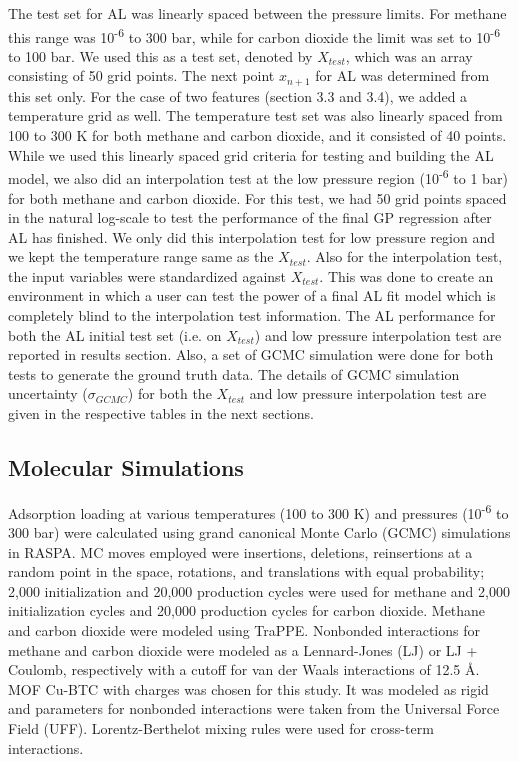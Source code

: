 \documentclass[twoside,twocolumn,9pt]{article}
\begin{document}
The test set for AL was linearly spaced between the pressure limits. For methane this range was 10\textsuperscript{-6} to 300 bar, while for carbon dioxide the limit was set to 10\textsuperscript{-6} to 100 bar. We used this as a test set, denoted by $X_{test}$, which was an array consisting of 50 grid points. The next point $x_{n+1}$ for AL was determined from this set only. For the case of two features (section 3.3 and 3.4), we added a temperature grid as well. The temperature test set was also linearly spaced from 100 to 300 K for both methane and carbon dioxide, and it consisted of 40 points. While we used this linearly spaced grid criteria for testing and building the AL model, we also did an interpolation test at the low pressure region (10\textsuperscript{-6} to 1 bar) for both methane and carbon dioxide. For this test, we had 50 grid points spaced in the natural log-scale to test the performance of the final GP regression after AL has finished. We only did this interpolation test for low pressure region and we kept the temperature range same as the $X_{test}$. Also for the interpolation test, the input variables were standardized against $X_{test}$. This was done to create an environment in which a user can test the power of a final AL fit model which is completely blind to the interpolation test information. The AL performance for both the AL initial test set (i.e. on $X_{test}$) and low pressure interpolation test are reported in results section. Also, a set of GCMC simulation were done for both tests to generate the ground truth data. The details of GCMC simulation uncertainty ($\sigma_{GCMC}$) for both the $X_{test}$ and low pressure interpolation test are given in the respective tables in the next sections.

\subsection{Molecular Simulations}
Adsorption loading at various temperatures (100 to 300 K) and pressures (10\textsuperscript{-6} to 300 bar) were calculated using grand canonical Monte Carlo (GCMC) simulations in RASPA. \cite{gcmc,gcmc2,raspa} MC moves employed were insertions, deletions, reinsertions at a random point in the space, rotations, and translations with equal probability; 2,000 initialization and 20,000 production cycles were used for methane and 2,000 initialization cycles and 20,000 production cycles for carbon dioxide. Methane and carbon dioxide were modeled using TraPPE.\cite{trappe} Nonbonded interactions for methane and carbon dioxide were modeled as a Lennard-Jones (LJ) or LJ + Coulomb, respectively with a cutoff for van der Waals interactions of 12.5 {\AA}.
MOF Cu-BTC with charges was chosen for this study.\cite{Lennard_Jones_1931} It was modeled as rigid and parameters for nonbonded interactions were taken from the Universal Force Field (UFF).\cite{UFF} %
Lorentz-Berthelot mixing rules were used for cross-term interactions.\cite{lorentz}
\end{document}
